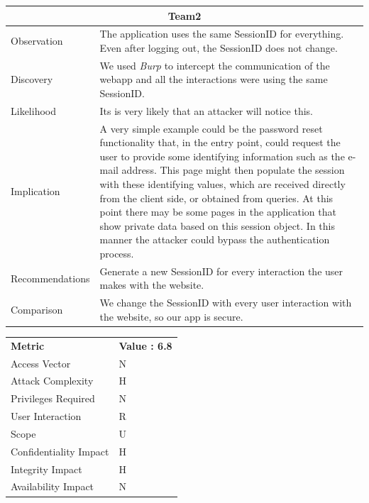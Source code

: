 \documentclass[headsepline,footsepline,footinclude=false,oneside,fontsize=11pt,paper=a4,listof=totoc,bibliography=totoc]{scrbook} %
\begin{document}
\begin{tabular}{ l|p{11cm}  }
	\hline
	\multicolumn{2}{c}{\textbf{Team2}} \\
	\hline
	Observation & The application uses the same SessionID for everything. Even after logging out, the SessionID does not change.\\
	Discovery & We used \textit{Burp} to intercept the communication of the webapp and all the interactions were using the same SessionID.\\
	Likelihood & Its is very likely that an attacker will notice this.\\
	Implication & A very simple example could be the password reset functionality that, in the entry point, could request the user to provide some identifying information such as the e-mail address. This page might then populate the session with these identifying values, which are received directly from the client side, or obtained from queries. At this point there may be some pages in the application that show private data based on this session object. In this manner the attacker could bypass the authentication process.\\
	Recommendations & Generate a new SessionID for every interaction the user makes with the website.\\
	Comparison & We change the SessionID with every user interaction with the website, so our app is secure. \\
	\hline
\end{tabular}
\begin{center}
	\begin{tabular}{ll}
		\rowcolor[HTML]{34CDF9}
		{\color[HTML]{ECF4FF} \textbf{Metric}}        & {\color[HTML]{ECF4FF} \textbf{Value : 6.8}} \\
		\rowcolor[HTML]{BBDAFF}
		{\color[HTML]{333333} Access Vector}          & {\color[HTML]{333333} } N             \\
		\rowcolor[HTML]{ECF4FF}
		{\color[HTML]{333333} Attack Complexity}      & {\color[HTML]{333333} } H              \\
		\rowcolor[HTML]{BBDAFF}
		{\color[HTML]{333333} Privileges Required}    & {\color[HTML]{333333} } N              \\
		\rowcolor[HTML]{ECF4FF}
		{\color[HTML]{333333} User Interaction}       & {\color[HTML]{333333} } R              \\
		\rowcolor[HTML]{BBDAFF}
		{\color[HTML]{333333} Scope}                  & {\color[HTML]{333333} } U              \\
		\rowcolor[HTML]{ECF4FF}
		{\color[HTML]{333333} Confidentiality Impact} & {\color[HTML]{333333} } H              \\
		\rowcolor[HTML]{BBDAFF}
		{\color[HTML]{333333} Integrity Impact}       & {\color[HTML]{333333} } H              \\
		\rowcolor[HTML]{ECF4FF}
		{\color[HTML]{333333} Availability Impact}    & {\color[HTML]{333333} } N
	\end{tabular}
\end{center}
\end{document}
